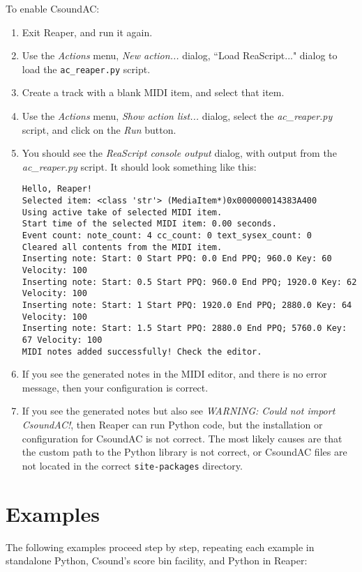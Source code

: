 \documentclass[letterpaper,10pt,DIV=12,parskip=half]{scrartcl}
\begin{document}
\noindent To enable CsoundAC:

\begin{enumerate}
\item Exit Reaper, and run it again.
\item Use the \emph{Actions} menu, \emph{New action...} dialog, ``Load ReaScript..." dialog to load the \lstinline|ac_reaper.py| script.
\item Create a track with a blank MIDI item, and select that item.
\item Use the \emph{Actions} menu, \emph{Show action list...} dialog, select the \emph{ac\_reaper.py} script, and click on the \emph{Run} button. 
\item You should see the \emph{ReaScript console output} dialog, with output from the \emph{ac\_reaper.py} script. It should look something like this:

\begin{lstlisting}[basicstyle=\small\ttfamily]
Hello, Reaper!
Selected item: <class 'str'> (MediaItem*)0x000000014383A400
Using active take of selected MIDI item.
Start time of the selected MIDI item: 0.00 seconds.
Event count: note_count: 4 cc_count: 0 text_sysex_count: 0
Cleared all contents from the MIDI item.
Inserting note: Start: 0 Start PPQ: 0.0 End PPQ; 960.0 Key: 60 Velocity: 100
Inserting note: Start: 0.5 Start PPQ: 960.0 End PPQ; 1920.0 Key: 62 Velocity: 100
Inserting note: Start: 1 Start PPQ: 1920.0 End PPQ; 2880.0 Key: 64 Velocity: 100
Inserting note: Start: 1.5 Start PPQ: 2880.0 End PPQ; 5760.0 Key: 67 Velocity: 100
MIDI notes added successfully! Check the editor.
\end{lstlisting}
\item If you see the generated notes in the MIDI editor, and there is no error message, then your configuration is correct.
\item If you see the generated notes but also see \emph{WARNING: Could not import CsoundAC!}, then Reaper can run Python code, but the installation or configuration for CsoundAC is not correct. The most likely causes are that the custom path to the Python library is not correct, or CsoundAC files are not located in the correct \lstinline|site-packages| directory.
\end{enumerate}

\section{Examples}

The following examples proceed step by step, repeating each example in standalone Python, Csound's score bin facility, and Python in Reaper:
\end{document}

